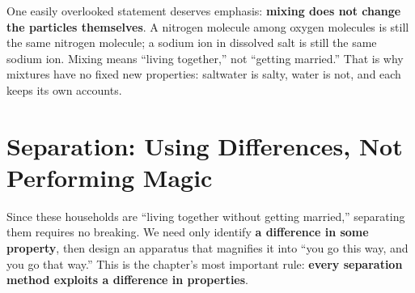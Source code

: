 One easily overlooked statement deserves emphasis: \textbf{mixing does not change the particles themselves}. A nitrogen molecule among oxygen molecules is still the same nitrogen molecule; a sodium ion in dissolved salt is still the same sodium ion. Mixing means ``living together,'' not ``getting married.'' That is why mixtures have no fixed new properties: saltwater is salty, water is not, and each keeps its own accounts.

\section{Separation: Using Differences, Not Performing Magic}

Since these households are ``living together without getting married,'' separating them requires no breaking. We need only identify \textbf{a difference in some property}, then design an apparatus that magnifies it into ``you go this way, and you go that way.'' This is the chapter's most important rule: \textbf{every separation method exploits a difference in properties}.

